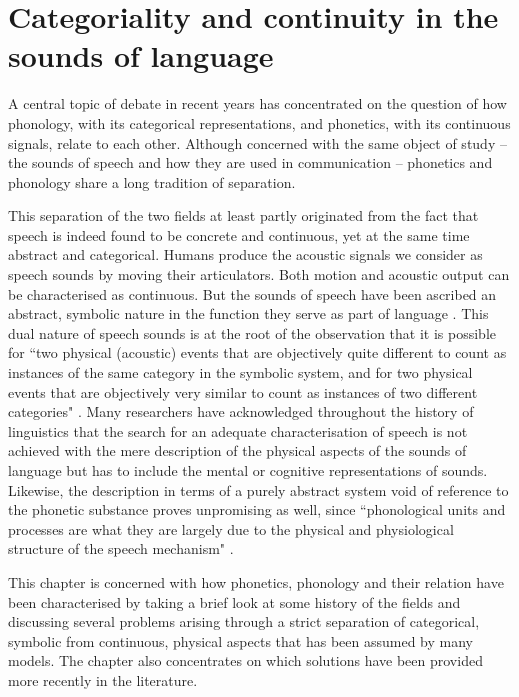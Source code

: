 \chapter{Categoriality and continuity in the sounds of language}
\label{chapter_pandp}

A central topic of debate in recent years has concentrated on the question of how phonology, with its categorical representations, and phonetics, with its continuous signals, relate to each other. Although concerned with the same object of study -- the sounds of speech and how they are used in communication -- phonetics and phonology share a long tradition of separation. 

This separation of the two fields at least partly originated from the fact that speech is indeed found to be concrete and continuous, yet at the same time abstract and categorical. Humans produce the acoustic signals we consider as speech sounds by moving their articulators. Both motion and acoustic output can be characterised as continuous. But the sounds of speech have been ascribed an abstract, symbolic nature in the function they serve as part of language \citep{Ladd2014,Pierrehumbert1990}. This dual nature of speech sounds is at the root of the observation that it is possible for ``two physical (acoustic) events that are objectively quite different to count as instances of the same category in the symbolic system, and for two physical events that are objectively very similar to count as instances of two different categories" \citep[29]{Ladd2014}. Many researchers have acknowledged throughout the history of linguistics that the search for an adequate characterisation of speech is not achieved with the mere description of the physical aspects of the sounds of language but has to include the mental or cognitive representations of sounds. Likewise, the description in terms of a purely abstract system void of reference to the phonetic substance proves unpromising as well, since ``phonological units and processes are what they are largely due to the physical and physiological structure of the speech mechanism" \citep[155]{Ohala1990}.

This chapter is concerned with how phonetics, phonology and their relation have been characterised by taking a brief look at some history of the fields and discussing several problems arising through a strict separation of categorical, symbolic from continuous, physical aspects that has been assumed by many models. The chapter also concentrates on which solutions have been provided more recently in the literature.


